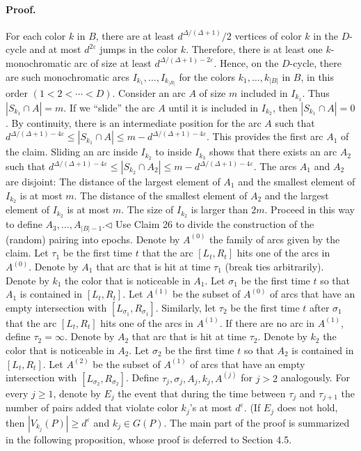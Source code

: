 \paragraph{Proof.} For each color $k$ in $B$, there are at least $d^{\Delta/(\Delta+1)}/2$ vertices of color $k$ in the $D$-cycle and at most $d^{2\varepsilon}$ jumps in the color $k$. Therefore, there is at least one $k$-monochromatic arc of size at least $d^{\Delta/(\Delta+1)-2\varepsilon}$. Hence, on the $D$-cycle, there are such monochromatic arcs $I_{k_1},\ldots,I_{k_{|B|}}$ for the colors $k_1,\ldots,k_{|B|}$ in $B$, in this order $(1<2<\cdots<D)$.
Consider an arc $A$ of size $m$ included in $I_{k_1}$. Thus $|S_{k_1}\cap A|=m$. If we ``slide'' the arc $A$ until it is included in $I_{k_2}$, then $|S_{k_1}\cap A|=0$. By continuity, there is an intermediate position for the arc $A$ such that $d^{\Delta/(\Delta+1)-4\varepsilon}\leq|S_{k_1}\cap A|\leq m-d^{\Delta/(\Delta+1)-4\varepsilon}$. This provides the first arc $A_1$ of the claim.
Sliding an arc inside $I_{k_2}$ to inside $I_{k_3}$ shows that there exists an arc $A_2$ such that $d^{\Delta/(\Delta+1)-4\varepsilon}\leq|S_{k_2}\cap A_2|\leq m-d^{\Delta/(\Delta+1)-4\varepsilon}$. The arcs $A_1$ and $A_2$ are disjoint: The distance of the largest element of $A_1$ and the smallest element of $I_{k_2}$ is at most $m$. The distance of the smallest element of $A_2$ and the largest element of $I_{k_2}$ is at most $m$. The size of $I_{k_2}$ is larger than $2m$. Proceed in this way to define $A_3,\ldots,A_{|B|-1}$.\hfill$\triangleleft$
Use Claim 26 to divide the construction of the (random) pairing into epochs. Denote by $A^{(0)}$ the family of arcs given by the claim. Let $\tau_1$ be the first time $t$ that the arc $[L_t,R_t]$ hits one of the arcs in $A^{(0)}$. Denote by $A_1$ that arc that is hit at time $\tau_1$ (break ties arbitrarily). Denote by $k_1$ the color that is noticeable in $A_1$. Let $\sigma_1$ be the first time $t$ so that $A_1$ is contained in $[L_t,R_t]$. Let $A^{(1)}$ be the subset of $A^{(0)}$ of arcs that have an empty intersection with $[L_{\sigma_1},R_{\sigma_1}]$. Similarly, let $\tau_2$ be the first time $t$ after $\sigma_1$ that the arc $[L_t,R_t]$ hits one of the arcs in $A^{(1)}$. If there are no arc in $A^{(1)}$, define $\tau_2=\infty$. Denote by $A_2$ that arc that is hit at time $\tau_2$. Denote by $k_2$ the color that is noticeable in $A_2$. Let $\sigma_2$ be the first time $t$ so that $A_2$ is contained in $[L_t,R_t]$. Let $A^{(2)}$ be the subset of $A^{(1)}$ of arcs that have an empty intersection with $[L_{\sigma_2},R_{\sigma_2}]$. Define $\tau_j,\sigma_j,A_j,k_j,A^{(j)}$ for $j>2$ analogously. For every $j\geq1$, denote by $E_j$ the event that during the time between $\tau_j$ and $\tau_{j+1}$ the number of pairs added that violate color $k_j$'s at most $d^\varepsilon$. (If $E_j$ does not hold, then $|V_{k_j}(P)|\geq d^\varepsilon$ and $k_j\in G(P)$. The main part of the proof is summarized in the following proposition, whose proof is deferred to Section 4.5.
